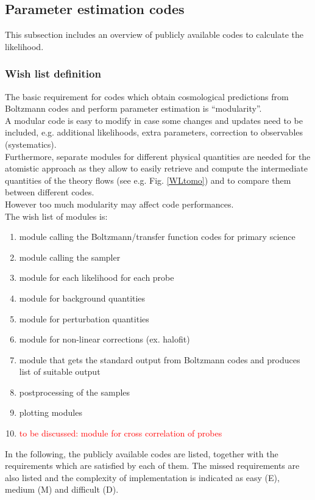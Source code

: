 \newpage
\subsection{Parameter estimation codes}
This subsection includes an overview of publicly available codes to calculate the likelihood.

\subsubsection{Wish list definition}

The basic requirement for codes which obtain cosmological predictions from Boltzmann codes and perform parameter estimation is ``modularity''.\\
A modular code is easy to modify in case some changes and updates need to be included, e.g. additional likelihoods, extra parameters, correction to observables (systematics).\\
Furthermore, separate modules for different physical quantities are needed for the atomistic approach as they allow to easily retrieve and compute the intermediate quantities of the theory
flows (see e.g. Fig. \ref{WLtomo}) and to compare them between different codes.\\
However too much modularity may affect code performances.\\

The wish list of modules is:
\begin{enumerate}
 \item module calling the Boltzmann/transfer function codes for primary science
 \item module calling the sampler
 \item module for each likelihood for each probe
 \item module for background quantities
 \item module for perturbation quantities
 \item module for non-linear corrections (ex. halofit)
 \item module that gets the standard output from Boltzmann codes and produces list of suitable output
 \item postprocessing of the samples
 \item plotting modules 
 \item \textcolor{red}{to be discussed: module for cross correlation of probes}
\end{enumerate}

In the following, the publicly available codes are listed, together with the requirements which are satisfied by each of them. The missed requirements are also listed and the complexity 
of implementation is indicated as easy (E), medium (M) and difficult (D).

